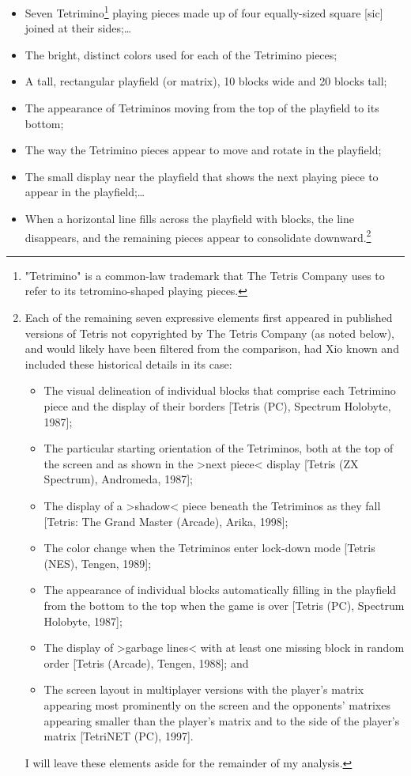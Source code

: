 \begin{quoting}
  \begin{itemize}
    \item[1.] {
      Seven Tetrimino\footnote{
        "Tetrimino\texttrademark" is a common-law trademark that The Tetris Company uses to refer to its tetromino-shaped playing pieces.
      } playing pieces made up of four equally-sized square [sic] joined at their sides;…}
\item[3.]{ The bright, distinct colors used for each of the Tetrimino pieces;}
\item[4.]{ A tall, rectangular playfield (or matrix), 10 blocks wide and 20 blocks tall;}
\item[5.]{ The appearance of Tetriminos moving from the top of the playfield to its bottom;}
\item[6.]{ The way the Tetrimino pieces appear to move and rotate in the playfield;}
\item[7.]{ The small display near the playfield that shows the next playing piece to appear in the playfield;…}
\item[11.]{ When a horizontal line fills across the playfield with blocks, the line disappears, and the remaining pieces appear to consolidate downward.\footnote{
  Each of the remaining seven expressive elements first appeared in published versions of Tetris not copyrighted by The Tetris Company (as noted below), and would likely have been filtered from the comparison, had Xio known and included these historical details in its case:
    \begin{itemize}
      \item[2.] { The visual delineation of individual blocks that comprise each Tetrimino piece and the display of their borders [Tetris (PC), Spectrum Holobyte, 1987]; }
      \item[8.] { The particular starting orientation of the Tetriminos, both at the top of the screen and as shown in the >next piece< display [Tetris (ZX Spectrum), Andromeda, 1987];}
      \item[9.] { The display of a >shadow< piece beneath the Tetriminos as they fall [Tetris: The Grand Master (Arcade), Arika, 1998];}
      \item[10.] { The color change when the Tetriminos enter lock-down mode [Tetris (NES), Tengen, 1989];}
      \item[12.] { The appearance of individual blocks automatically filling in the playfield from the bottom to the top when the game is over [Tetris (PC), Spectrum Holobyte, 1987];}
      \item[13.] { The display of >garbage lines< with at least one missing block in random order [Tetris (Arcade), Tengen, 1988]; and}
      \item[14.] { The screen layout in multiplayer versions with the player's matrix appearing most prominently on the screen and the opponents' matrixes appearing smaller than the player's matrix and to the side of the player's matrix [TetriNET (PC), 1997].}
    \end{itemize}
  I will leave these elements aside for the remainder of my analysis.
} \autocite[397--8]{tetris-xio}}
\end{itemize}
\end{quoting}
